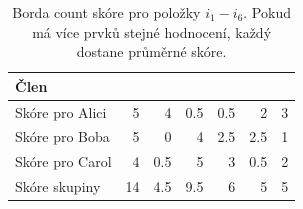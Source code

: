 \documentclass[12pt,a4paper]{report}
\begin{document}
\begin{table}[b!]
    \centering
    \begin{tabular}{l@{\hspace{1.3cm}}D{.}{,}{3.2}D{.}{,}{2.3}D{.}{,}{2.3}D{.}{,}{2.3}D{.}{,}{2.3}D{.}{,}{2.3}}
    \toprule
    \textbf{Člen} &
     &
     &
     &
     &
     &
     \\
    \midrule
    Skóre pro Alici & 5 & 4 & 0.5 & 0.5 & 2 & 3 \\
    Skóre pro Boba   & 5 & 0 & 4 & 2.5 & 2.5 & 1 \\
    Skóre pro Carol & 4 & 0.5 & 5 & 3 & 0.5 & 2 \\
    Skóre skupiny & 14 & 4.5 & 9.5 & 6 & 5 & 5 \\
    \bottomrule
    \end{tabular}
    \caption{Borda count skóre pro položky $i_1 - i_6$. Pokud má více prvků stejné
    hodnocení, každý dostane průměrné skóre. }
    \label{tab:BordaScore}
\end{table}
\end{document}
